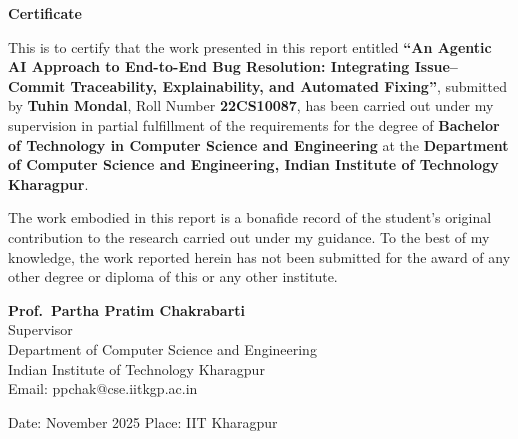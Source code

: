 \documentclass[11pt,english,a4paper]{article}
\begin{document}
\newpage
\begin{center}
    {\Large\textbf{Certificate}}\\[0.4in]
\end{center}

This is to certify that the work presented in this report entitled \textbf{``An Agentic AI Approach to End-to-End Bug Resolution: Integrating Issue–Commit Traceability, Explainability, and Automated Fixing''}, submitted by \textbf{Tuhin Mondal}, Roll Number \textbf{22CS10087}, has been carried out under my supervision in partial fulfillment of the requirements for the degree of \textbf{Bachelor of Technology in Computer Science and Engineering} at the \textbf{Department of Computer Science and Engineering, Indian Institute of Technology Kharagpur}.\\

\vspace{0.1in}

The work embodied in this report is a bonafide record of the student’s original contribution to the research carried out under my guidance. To the best of my knowledge, the work reported herein has not been submitted for the award of any other degree or diploma of this or any other institute.

\vspace{4in}

\begin{flushright}
\textbf{Prof.\ Partha Pratim Chakrabarti}\\
Supervisor\\
Department of Computer Science and Engineering\\
Indian Institute of Technology Kharagpur\\
Email: ppchak@cse.iitkgp.ac.in
\end{flushright}

\vspace{0.8in}
\noindent
Date: November 2025 \hfill Place: IIT Kharagpur


\end{document}
